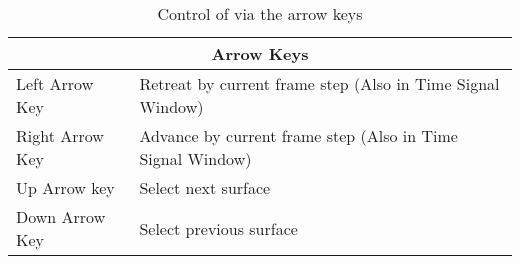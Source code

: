 \begin{table}[htbp]
\begin{center}
\begin{tabular}{|l|l|} \hline
        \multicolumn{2}{|c||}{\textbf{Arrow Keys}} \\ \hline
        Left Arrow Key  &       Retreat by current frame step (Also in Time
        Signal Window) \\ 
        Right Arrow Key &       Advance by current frame step (Also in Time
        Signal Window)\\ 
        Up Arrow key    &       Select next surface \\
        Down Arrow Key  &       Select previous surface \\ \hline
\end{tabular}
\end{center}
\caption{\label{table:arrowkeys} Control of \map{} via the arrow keys}

\end{table}


